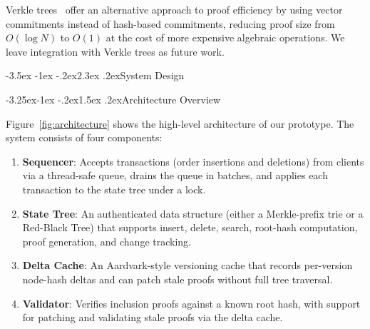 \documentclass[letterpaper,twocolumn,10pt]{article}
\makeatletter
\renewcommand{\section}{\@startsection{section}{1}{\z@}%
  {-3.5ex \@plus -1ex \@minus -.2ex}{2.3ex \@plus.2ex}{\normalfont\large\bfseries}}
\renewcommand{\subsection}{\@startsection{subsection}{2}{\z@}%
  {-3.25ex\@plus -1ex \@minus -.2ex}{1.5ex \@plus .2ex}{\normalfont\normalsize\bfseries}}
\makeatother
\begin{document}
Verkle trees~\cite{kuszmaul2019verkle} offer an alternative approach to proof efficiency by using vector commitments instead of hash-based commitments, reducing proof size from $O(\log N)$ to $O(1)$ at the cost of more expensive algebraic operations.
We leave integration with Verkle trees as future work.

\section{System Design}
\label{sec:design}

\subsection{Architecture Overview}

Figure~\ref{fig:architecture} shows the high-level architecture of our prototype.
The system consists of four components:

\begin{enumerate}
  \item \textbf{Sequencer}: Accepts transactions (order insertions and deletions) from clients via a thread-safe queue, drains the queue in batches, and applies each transaction to the state tree under a lock.
  \item \textbf{State Tree}: An authenticated data structure (either a Merkle-prefix trie or a Red-Black Tree) that supports insert, delete, search, root-hash computation, proof generation, and change tracking.
  \item \textbf{Delta Cache}: An Aardvark-style versioning cache that records per-version node-hash deltas and can patch stale proofs without full tree traversal.
  \item \textbf{Validator}: Verifies inclusion proofs against a known root hash, with support for patching and validating stale proofs via the delta cache.
\end{enumerate}
\end{document}
